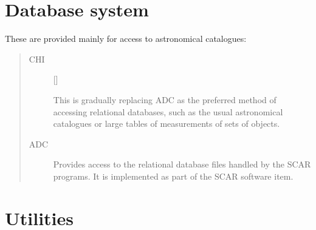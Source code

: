 \section{Database system}

These are provided mainly for access to astronomical catalogues:
\begin{quote}
\begin{description}

\item [CHI] \hfill []

 This is gradually replacing ADC as the preferred method of accessing
 relational databases, such as the usual astronomical catalogues or large
 tables of measurements of sets of objects. 

\item [ADC] \hfill

 Provides access to the relational database files handled by the SCAR programs.
 It is implemented as part of the SCAR software item.

\end{description}
\end{quote}

\section{Utilities}

